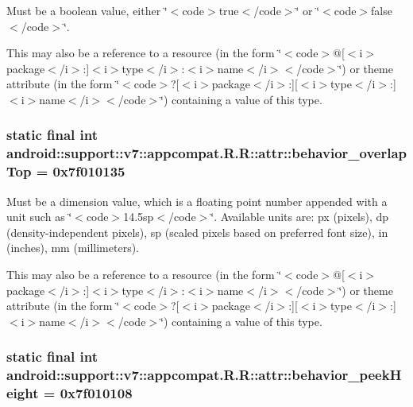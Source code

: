 Must be a boolean value, either \char`\"{}$<$code$>$true$<$/code$>$\char`\"{} or \char`\"{}$<$code$>$false$<$/code$>$\char`\"{}. 

This may also be a reference to a resource (in the form \char`\"{}$<$code$>$@\mbox{[}$<$i$>$package$<$/i$>$:\mbox{]}$<$i$>$type$<$/i$>$:$<$i$>$name$<$/i$>$$<$/code$>$\char`\"{}) or theme attribute (in the form \char`\"{}$<$code$>$?\mbox{[}$<$i$>$package$<$/i$>$:\mbox{]}\mbox{[}$<$i$>$type$<$/i$>$:\mbox{]}$<$i$>$name$<$/i$>$$<$/code$>$\char`\"{}) containing a value of this type. \hypertarget{classandroid_1_1support_1_1v7_1_1appcompat_1_1_r_1_1attr_1c537e46ea1bd1ad77a0c95c4e4e5eb7}{
\subsubsection[{behavior\_\-overlapTop}]{\setlength{\rightskip}{0pt plus 5cm}static final int android::support::v7::appcompat.R.R::attr::behavior\_\-overlapTop = 0x7f010135}}
\label{classandroid_1_1support_1_1v7_1_1appcompat_1_1_r_1_1attr_1c537e46ea1bd1ad77a0c95c4e4e5eb7}


Must be a dimension value, which is a floating point number appended with a unit such as \char`\"{}$<$code$>$14.5sp$<$/code$>$\char`\"{}. Available units are: px (pixels), dp (density-independent pixels), sp (scaled pixels based on preferred font size), in (inches), mm (millimeters). 

This may also be a reference to a resource (in the form \char`\"{}$<$code$>$@\mbox{[}$<$i$>$package$<$/i$>$:\mbox{]}$<$i$>$type$<$/i$>$:$<$i$>$name$<$/i$>$$<$/code$>$\char`\"{}) or theme attribute (in the form \char`\"{}$<$code$>$?\mbox{[}$<$i$>$package$<$/i$>$:\mbox{]}\mbox{[}$<$i$>$type$<$/i$>$:\mbox{]}$<$i$>$name$<$/i$>$$<$/code$>$\char`\"{}) containing a value of this type. \hypertarget{classandroid_1_1support_1_1v7_1_1appcompat_1_1_r_1_1attr_4205436ba579d01b4e60691250100ad8}{
\subsubsection[{behavior\_\-peekHeight}]{\setlength{\rightskip}{0pt plus 5cm}static final int android::support::v7::appcompat.R.R::attr::behavior\_\-peekHeight = 0x7f010108}}
\label{classandroid_1_1support_1_1v7_1_1appcompat_1_1_r_1_1attr_4205436ba579d01b4e60691250100ad8}


